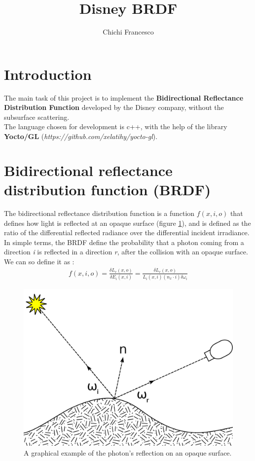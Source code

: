 \documentclass[11pt]{article}
\title{Disney BRDF}
\author{Chichi Francesco}
\begin{document}
\maketitle
\graphicspath{{img/}}
\tableofcontents

\section{Introduction}
	The main task of this project is to implement the \textbf{Bidirectional Reflectance Distribution Function} developed by the Disney company, without the subsurface scattering.\\ 
	The language chosen for development is c++, with the help of the library \textbf{Yocto/GL} (\textit{https://github.com/xelatihy/yocto-gl}).

\newpage
\section{Bidirectional reflectance distribution function (BRDF)}
The bidirectional reflectance distribution function is a function $ f(x,i,o) $ that defines how light is reflected at an opaque surface (figure \ref{fig:reflect}), and is defined as the ratio of the differential reflected radiance over the
differential incident irradiance. 
In simple terms, the BRDF define the probability that a photon coming from a direction \textit{i} is reflected in a direction \textit{r}, after the collision with an opaque surface.
We can so define it as \cite{slide}:
\begin{align*}
	f(x,i,o)=\frac{\delta L_r(x,o)}{\delta E_i(x,i)} = \frac{\delta L_r(x,o)}{L_i(x,i)(n_x\cdot i) \delta \omega_i} 
\end{align*}

\begin{figure} [H]
	\centering
	\includegraphics[width=0.5\linewidth]{img/reflect}
	\caption{A graphical example of the photon's reflection on an opaque surface.}
	\label{fig:reflect}
\end{figure}
\end{document}
